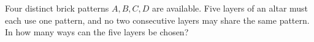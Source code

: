 
Four distinct brick patterns \(A,B,C,D\) are available. Five layers of an altar must each use one pattern, and no two consecutive layers may share the same pattern. In how many ways can the five layers be chosen?
